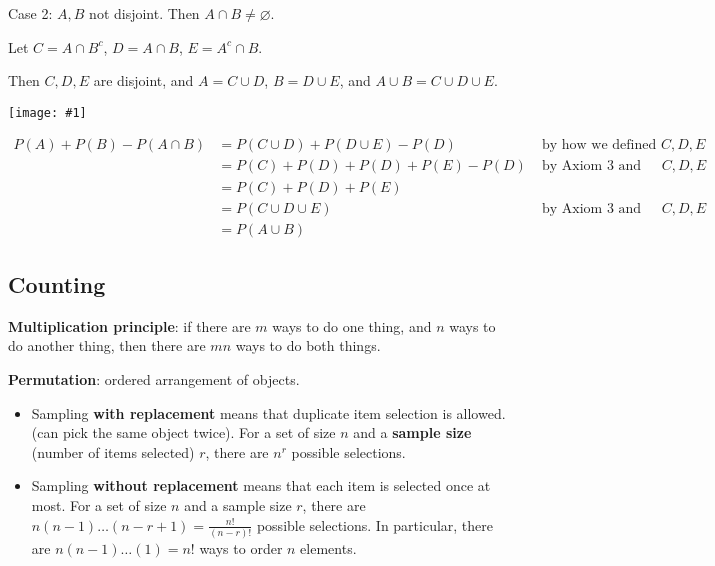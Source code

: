 \documentclass[a4paper,10pt]{article}
\newcommand{\fig}[1]{\centerline{\texttt{[image: \#1]}}}
\newcommand{\ind}{\leavevmode{\parindent=1em\indent}}
\begin{document}
\begin{itemize}
        \ind Case 2: $A, B$ not disjoint. Then $A\cap B \neq \varnothing$.

        \ind \ind Let $C = A\cap B^c$, $D = A\cap B$, $E = A^c\cap B$. 

        \ind \ind Then $C, D, E$ are disjoint, and $A = C\cup D$, $B = D\cup E$, and $A\cup B = C\cup D\cup E$. 

        \fig{addition_law}
        
        \begin{align*}
            P(A) + P(B) - P(A\cap B) &= P(C\cup D) + P(D\cup E) - P(D)\;&\text{by how we defined $C, D, E$}\\
                                     &= P(C) + P(D) + P(D) + P(E) - P(D)\;&\text{by Axiom 3 and disjointness of $C, D, E$}\\
                                     &= P(C) + P(D) + P(E) \\
                                     &= P(C\cup D\cup E)\;&\text{by Axiom 3 and disjointness of $C, D, E$}\\
                                     &= P(A\cup B)
        \end{align*}
\end{itemize} 

\subsection{Counting}

\textbf{Multiplication principle}: if there are $m$ ways to do one thing, and $n$ ways to do another thing, then there are $mn$ ways to do both things. 

\textbf{Permutation}: ordered arrangement of objects. 

\begin{itemize}
    \item Sampling \textbf{with replacement} means that duplicate item selection is allowed. (can pick the same object twice). For a set of size $n$ and a \textbf{sample size} (number of items selected) $r$, there are $n^r$ possible selections. 

    \item Sampling \textbf{without replacement} means that each item is selected once at most. For a set of size $n$ and a sample size $r$, there are $n(n-1)\ldots(n-r+1) = \frac{n!}{(n-r)!}$ possible selections. In particular, there are $n(n-1)\ldots(1)=n!$ ways to order $n$ elements. 
\end{itemize}
\end{document}
